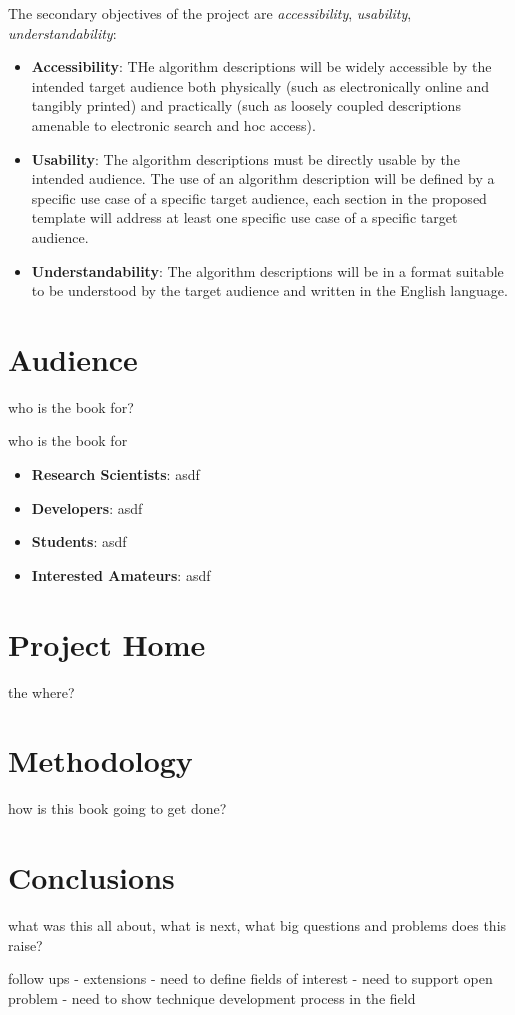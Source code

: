 \documentclass[a4paper, 11pt]{article}
\begin{document}
The secondary objectives of the project are \emph{accessibility}, \emph{usability}, \emph{understandability}:

\begin{itemize}
	\item \textbf{Accessibility}: THe algorithm descriptions will be widely accessible by the intended target audience both physically (such as electronically online and tangibly printed) and practically (such as loosely coupled descriptions amenable to electronic search and hoc access).
	\item \textbf{Usability}: The algorithm descriptions must be directly usable by the intended audience. The use of an algorithm description will be defined by a specific use case of a specific target audience, each section in the proposed template will address at least one specific use case of a specific target audience.
	\item \textbf{Understandability}: The algorithm descriptions will be in a format suitable to be understood by the target audience and written in the English language.
\end{itemize}

\section{Audience}
\label{sec:audience}
who is the book for?

who is the book for 

\begin{itemize}
	\item \textbf{Research Scientists}: asdf
	\item \textbf{Developers}: asdf
	\item \textbf{Students}: asdf
	\item \textbf{Interested Amateurs}: asdf
\end{itemize}


\section{Project Home}
the where?

\section{Methodology}
\label{sec:methodology}
how is this book going to get done?


\section{Conclusions}
\label{sec:conclusions}
what was this all about, what is next, what big questions and problems does this raise?


follow ups - extensions
- need to define fields of interest
- need to support open problem
- need to show technique development process in the field
\end{document}
